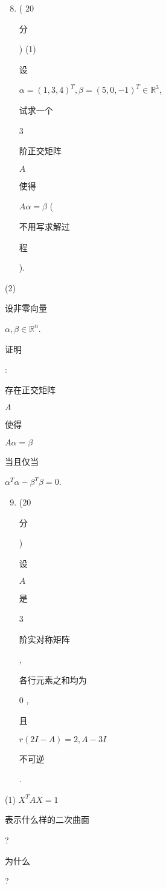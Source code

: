 \documentclass[10pt]{article}
\begin{document}
\begin{enumerate}
  \setcounter{enumi}{7}
  \item ( 20 \begin{CJK}{UTF8}{mj}分\end{CJK}) (1) \begin{CJK}{UTF8}{mj}设\end{CJK} $\alpha=(1,3,4)^{T}, \beta=(5,0,-1)^{T} \in \mathbb{R}^{3}$, \begin{CJK}{UTF8}{mj}试求一个\end{CJK} 3 \begin{CJK}{UTF8}{mj}阶正交矩阵\end{CJK} $A$ \begin{CJK}{UTF8}{mj}使得\end{CJK} $A \alpha=\beta$ (\begin{CJK}{UTF8}{mj}不用写求解过\end{CJK} \begin{CJK}{UTF8}{mj}程\end{CJK}).
\end{enumerate}
(2) \begin{CJK}{UTF8}{mj}设非零向量\end{CJK} $\alpha, \beta \in \mathbb{R}^{n}$. \begin{CJK}{UTF8}{mj}证明\end{CJK}: \begin{CJK}{UTF8}{mj}存在正交矩阵\end{CJK} $A$ \begin{CJK}{UTF8}{mj}使得\end{CJK} $A \alpha=\beta$ \begin{CJK}{UTF8}{mj}当且仅当\end{CJK} $\alpha^{T} \alpha-\beta^{T} \beta=0$.

\begin{enumerate}
  \setcounter{enumi}{8}
  \item (20 \begin{CJK}{UTF8}{mj}分\end{CJK}) \begin{CJK}{UTF8}{mj}设\end{CJK} $A$ \begin{CJK}{UTF8}{mj}是\end{CJK} 3 \begin{CJK}{UTF8}{mj}阶实对称矩阵\end{CJK}, \begin{CJK}{UTF8}{mj}各行元素之和均为\end{CJK} 0 , \begin{CJK}{UTF8}{mj}且\end{CJK} $r(2 I-A)=2, A-3 I$ \begin{CJK}{UTF8}{mj}不可逆\end{CJK}.
\end{enumerate}
(1) $X^{T} A X=1$ \begin{CJK}{UTF8}{mj}表示什么样的二次曲面\end{CJK}? \begin{CJK}{UTF8}{mj}为什么\end{CJK}?
\end{document}
